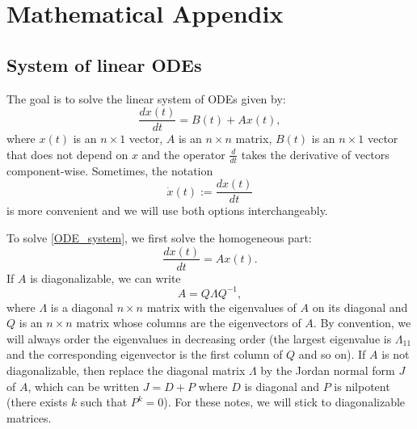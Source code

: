 \documentclass[../../lecture_notes.tex]{subfiles}
\begin{document}
\section{Mathematical Appendix}
\subsection{System of linear ODEs}
The goal is to solve the linear system of ODEs given by:
\begin{equation}
  \frac{dx(t)}{dt}=B(t)+Ax(t),
  \label{ODE_system}
\end{equation}
where $x(t)$ is an $n\times 1$ vector, $A$ is an $n\times n$ matrix, $B(t)$ is an $n\times 1$ vector that does not depend on $x$ and the operator $\frac{d}{dt}$ takes the derivative of vectors component-wise.
Sometimes, the notation
\begin{equation*}
  \dot{x}(t):= \frac{dx(t)}{dt}
\end{equation*}
is more convenient and we will use both options interchangeably.

To solve \eqref{ODE_system}, we first solve the homogeneous part:
\begin{equation}
  \frac{dx(t)}{dt}=Ax(t).
  \label{ODE_homogeneous}
\end{equation}
If $A$ is diagonalizable, we can write
\begin{equation*}
  A=Q\Lambda Q^{-1},
\end{equation*}
where $\Lambda$ is a diagonal $n\times n$ matrix with the eigenvalues of $A$ on its diagonal and $Q$ is an $n\times n$ matrix whose columns are the eigenvectors of $A$.
By convention, we will always order the eigenvalues in decreasing order (the largest eigenvalue is $\Lambda_{11}$ and the corresponding eigenvector is the first column of $Q$ and so on).
If $A$ is not diagonalizable, then replace the diagonal matrix $\Lambda$ by the Jordan normal form $J$ of $A$, which can be written $J=D+P$ where $D$ is diagonal and $P$ is nilpotent (there exists $k$ such that $P^{k}=0$).
For these notes, we will stick to diagonalizable matrices.
\end{document}
